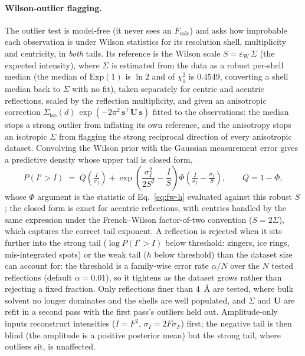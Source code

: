 \documentclass{iucrjournals}
\begin{document}
\paragraph{Wilson-outlier flagging.}
The outlier test is model-free (it never sees an $F_\mathrm{calc}$) and asks
how improbable each observation is under Wilson statistics for its resolution
shell, multiplicity and centricity, in \emph{both} tails. Its reference is the
Wilson scale $S = \varepsilon_\mathrm{W}\,\Sigma$ (the expected intensity), where $\Sigma$ is estimated
from the data as a robust per-shell median (the median of $\mathrm{Exp}(1)$ is
$\ln 2$ and of $\chi^{2}_{1}$ is $0.4549$, converting a shell median back to
$\Sigma$ with no fit), taken separately for centric and acentric reflections,
scaled by the reflection multiplicity, and given an anisotropic correction
$\Sigma_\mathrm{iso}(d)\,\exp(-2\pi^{2}\,\mathbf{s}^{\top}\mathbf{U}\,\mathbf{s})$
fitted to the observations: the median stops a strong outlier from inflating its
own reference, and the anisotropy stops an isotropic $\Sigma$ from flagging the
strong reciprocal direction of every anisotropic dataset. Convolving the Wilson
prior with the Gaussian measurement error gives a predictive density whose upper
tail is closed form,
%
\begin{equation}
  P(I' > I) \;=\; Q\!\left(\tfrac{I}{\sigma_{I}}\right)
  + \exp\!\left(\frac{\sigma_{I}^{2}}{2 S^{2}} - \frac{I}{S}\right)
    \Phi\!\left(\tfrac{I}{\sigma_{I}} - \tfrac{\sigma_{I}}{S}\right),
  \qquad Q = 1 - \Phi ,
  \label{eq:wilson-outlier}
\end{equation}
%
whose $\Phi$ argument is the statistic of Eq.~\ref{eq:fw-h} evaluated against this
robust $S$; the closed form is exact for acentric reflections, with centrics
handled by the same expression under the French--Wilson factor-of-two convention
($S = 2\Sigma$), which captures the correct tail exponent. A reflection is rejected
when it sits further into the strong tail
($\log P(I'>I)$ below threshold: zingers, ice rings, mis-integrated spots) or the
weak tail ($h$ below threshold) than the dataset size can account for: the
threshold is a family-wise error rate $\alpha/N$ over the $N$ tested reflections
(default $\alpha = 0.01$), so it tightens as the dataset grows rather than rejecting
a fixed fraction. Only reflections finer than $4$~\AA{} are tested, where bulk
solvent no longer dominates and the shells are well populated, and $\Sigma$ and
$\mathbf{U}$ are refit in a second pass with the first pass's outliers held out.
Amplitude-only inputs reconstruct intensities ($I = F^{2}$,
$\sigma_{I} = 2F\sigma_{F}$) first; the negative tail is then blind (the amplitude
is a positive posterior mean) but the strong tail, where outliers sit, is
unaffected.
\end{document}
